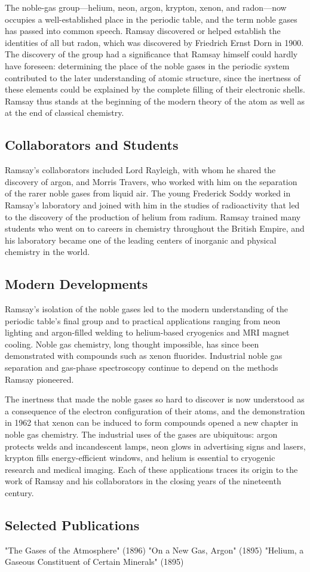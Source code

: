 The noble-gas group—helium, neon, argon, krypton, xenon, and radon—now occupies a well-established place in the periodic table, and the term noble gases has passed into common speech. Ramsay discovered or helped establish the identities of all but radon, which was discovered by Friedrich Ernst Dorn in 1900. The discovery of the group had a significance that Ramsay himself could hardly have foreseen: determining the place of the noble gases in the periodic system contributed to the later understanding of atomic structure, since the inertness of these elements could be explained by the complete filling of their electronic shells. Ramsay thus stands at the beginning of the modern theory of the atom as well as at the end of classical chemistry.

\subsection*{Collaborators and Students}

Ramsay's collaborators included Lord Rayleigh, with whom he shared the discovery of argon, and Morris Travers, who worked with him on the separation of the rarer noble gases from liquid air. The young Frederick Soddy worked in Ramsay's laboratory and joined with him in the studies of radioactivity that led to the discovery of the production of helium from radium. Ramsay trained many students who went on to careers in chemistry throughout the British Empire, and his laboratory became one of the leading centers of inorganic and physical chemistry in the world.

\subsection*{Modern Developments}

Ramsay's isolation of the noble gases led to the modern understanding of the periodic table's final group and to practical applications ranging from neon lighting and argon-filled welding to helium-based cryogenics and MRI magnet cooling. Noble gas chemistry, long thought impossible, has since been demonstrated with compounds such as xenon fluorides. Industrial noble gas separation and gas-phase spectroscopy continue to depend on the methods Ramsay pioneered.

The inertness that made the noble gases so hard to discover is now understood as a consequence of the electron configuration of their atoms, and the demonstration in 1962 that xenon can be induced to form compounds opened a new chapter in noble gas chemistry. The industrial uses of the gases are ubiquitous: argon protects welds and incandescent lamps, neon glows in advertising signs and lasers, krypton fills energy-efficient windows, and helium is essential to cryogenic research and medical imaging. Each of these applications traces its origin to the work of Ramsay and his collaborators in the closing years of the nineteenth century.

\subsection*{Selected Publications}

"The Gases of the Atmosphere" (1896)
"On a New Gas, Argon" (1895)
"Helium, a Gaseous Constituent of Certain Minerals" (1895)
